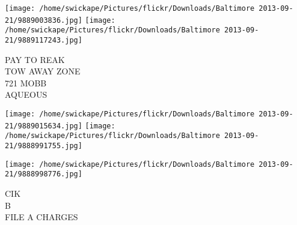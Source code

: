 \documentclass[10pt,letterpaper]{article}
\begin{document}
\texttt{[image: /home/swickape/Pictures/flickr/Downloads/Baltimore 2013-09-21/9889003836.jpg]}
\texttt{[image: /home/swickape/Pictures/flickr/Downloads/Baltimore 2013-09-21/9889117243.jpg]}

PAY TO REAK\\
TOW AWAY ZONE\\
721 MOBB\\
AQUEOUS\\
\pagebreak

\texttt{[image: /home/swickape/Pictures/flickr/Downloads/Baltimore 2013-09-21/9889015634.jpg]}
\texttt{[image: /home/swickape/Pictures/flickr/Downloads/Baltimore 2013-09-21/9888991755.jpg]}

\vspace{0.25in}
\texttt{[image: /home/swickape/Pictures/flickr/Downloads/Baltimore 2013-09-21/9888998776.jpg]}

CIK\\
B\\
FILE A CHARGES\\
\pagebreak
\end{document}
